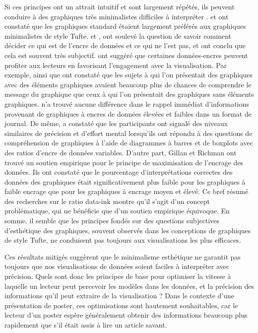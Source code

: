 \documentclass[
  french,
]{scrbook}
\begin{document}
Si ces principes ont un attrait intuitif et sont largement répétés, ils peuvent conduire à des graphiques très minimalistes difficiles à interpréter \autocite{tukey1990}. \textcite{inbar2007} et \textcite{kulla-mader2007} ont constaté que les graphiques standard étaient largement préférés aux graphiques minimalistes de style Tufte. \textcite{kosslyn1992} et \textcite{carswell1992}, ont soulevé la question de savoir comment décider ce qui est de l'encre de données et ce qui ne l'est pas, et ont conclu que cela est souvent très subjectif. \textcite{hullman2011} ont suggéré que certaines données-encres peuvent profiter aux lecteurs en favorisant l'engagement avec la visualisation. Par exemple, \textcite{bateman2010} ainsi que \textcite{li2014} ont constaté que les sujets à qui l'on présentait des graphiques avec des éléments graphiques avaient beaucoup plus de chances de comprendre le message du graphique que ceux à qui l'on présentait des graphiques sans éléments graphiques. \textcite{kelly1989} n'a trouvé aucune différence dans le rappel immédiat d'informations provenant de graphiques à encres de données élevées et faibles dans un format de journal. De même, \textcite{mcgurgan2015} a constaté que les participants ont signalé des niveaux similaires de précision et d'effort mental lorsqu'ils ont répondu à des questions de compréhension de graphiques à l'aide de diagrammes à barres et de boxplots avec des ratios d'encre de données variables. D'autre part, Gillan et Richman \autocite*{gillan1994,gillan1994} ont trouvé un soutien empirique pour le principe de maximisation de l'encrage des données. Ils ont constaté que le pourcentage d'interprétations correctes des données des graphiques était significativement plus faible pour les graphiques à faible encrage que pour les graphiques à encrage moyen et élevé. Ce bref résumé des recherches sur le ratio data-ink montre qu'il s'agit d'un concept problématique, qui ne bénéficie que d'un soutien empirique équivoque. En somme, il semble que les principes fondés sur des questions subjectives d'esthétique des graphiques, souvent observés dans les conceptions de graphiques de style Tufte, ne conduisent pas toujours aux visualisations les plus efficaces.

Ces résultats mitigés suggèrent que le minimalisme esthétique ne garantit pas toujours que nos visualisations de données soient faciles à interpréter avec précision. Quels sont donc les principes de base pour optimiser la vitesse à laquelle un lecteur peut percevoir les modèles dans les données, et la précision des informations qu'il peut extraire de la visualisation ? Dans le contexte d'une présentation de poster, ces optimisations sont hautement souhaitables, car le lecteur d'un poster espère généralement obtenir des informations beaucoup plus rapidement que s'il était assis à lire un article savant.
\end{document}
